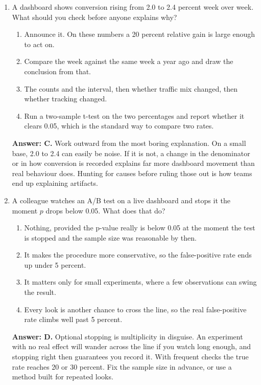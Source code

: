 \documentclass[11pt]{article}
\begin{document}
\begin{enumerate}[itemsep=14pt]
\item A dashboard shows conversion rising from 2.0 to 2.4 percent week over week. What should you check before anyone explains why?

\begin{enumerate}[label=\Alph*., itemsep=1pt, topsep=3pt]
  \item Announce it. On these numbers a 20 percent relative gain is large enough to act on.
  \item Compare the week against the same week a year ago and draw the conclusion from that.
  \item The counts and the interval, then whether traffic mix changed, then whether tracking changed.
  \item Run a two-sample t-test on the two percentages and report whether it clears 0.05, which is the standard way to compare two rates.
\end{enumerate}

\vspace{2pt}
\textbf{Answer: C.} Work outward from the most boring explanation. On a small base, 2.0 to 2.4 can easily be noise. If it is not, a change in the denominator or in how conversion is recorded explains far more dashboard movement than real behaviour does. Hunting for causes before ruling those out is how teams end up explaining artifacts.
\vspace{4pt}

\item A colleague watches an A/B test on a live dashboard and stops it the moment $p$ drops below 0.05. What does that do?

\begin{enumerate}[label=\Alph*., itemsep=1pt, topsep=3pt]
  \item Nothing, provided the p-value really is below 0.05 at the moment the test is stopped and the sample size was reasonable by then.
  \item It makes the procedure more conservative, so the false-positive rate ends up under 5 percent.
  \item It matters only for small experiments, where a few observations can swing the result.
  \item Every look is another chance to cross the line, so the real false-positive rate climbs well past 5 percent.
\end{enumerate}

\vspace{2pt}
\textbf{Answer: D.} Optional stopping is multiplicity in disguise. An experiment with no real effect will wander across the line if you watch long enough, and stopping right then guarantees you record it. With frequent checks the true rate reaches 20 or 30 percent. Fix the sample size in advance, or use a method built for repeated looks.
\vspace{4pt}


\end{enumerate}
\end{document}

